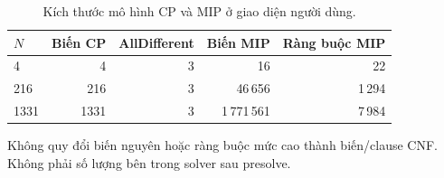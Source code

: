 \begin{table}[pos=H]
\centering
\small
\caption{Kích thước mô hình CP và MIP ở giao diện người dùng.}
\label{tab:native_size}
\setlength{\tabcolsep}{4pt}
\begin{tabular}{@{}lrrrr@{}}
\toprule
$N$ & Biến CP & AllDifferent & Biến MIP & Ràng buộc MIP \\
\midrule
4 & 4 & 3 & 16 & 22 \\
216 & 216 & 3 & 46\,656 & 1\,294 \\
1331 & 1331 & 3 & 1\,771\,561 & 7\,984 \\
\bottomrule
\end{tabular}
\par\smallskip\begin{minipage}{\linewidth}\footnotesize Không quy đổi biến nguyên hoặc ràng buộc mức cao thành biến/clause CNF. Không phải số lượng bên trong solver sau presolve.\end{minipage}
\end{table}
